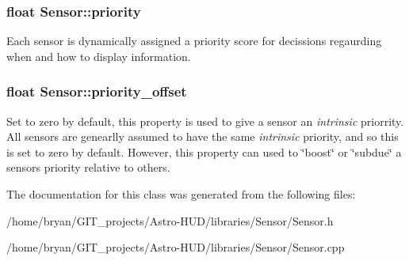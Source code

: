\subsubsection[{\texorpdfstring{priority}{priority}}]{\setlength{\rightskip}{0pt plus 5cm}float Sensor\+::priority}\hypertarget{classSensor_a8fb814c9040a311ef303cff56b793064}{}\label{classSensor_a8fb814c9040a311ef303cff56b793064}
Each sensor is dynamically assigned a priority score for decissions regaurding when and how to display information. 
\subsubsection[{\texorpdfstring{priority\+\_\+offset}{priority_offset}}]{\setlength{\rightskip}{0pt plus 5cm}float Sensor\+::priority\+\_\+offset}\hypertarget{classSensor_aa92fdf39b5b6a39e4be505b3006bda02}{}\label{classSensor_aa92fdf39b5b6a39e4be505b3006bda02}
Set to zero by default, this property is used to give a sensor an {\itshape intrinsic} priorrity. All sensors are genearlly assumed to have the same {\itshape intrinsic} priority, and so this is set to zero by default. However, this property can used to \char`\"{}boost\char`\"{} or \char`\"{}subdue\char`\"{} a sensor\textquotesingle{}s priority relative to others. 

The documentation for this class was generated from the following files\+:\begin{DoxyCompactItemize}
\item 
/home/bryan/\+G\+I\+T\+\_\+projects/\+Astro-\/\+H\+U\+D/libraries/\+Sensor/Sensor.\+h\item 
/home/bryan/\+G\+I\+T\+\_\+projects/\+Astro-\/\+H\+U\+D/libraries/\+Sensor/Sensor.\+cpp\end{DoxyCompactItemize}

